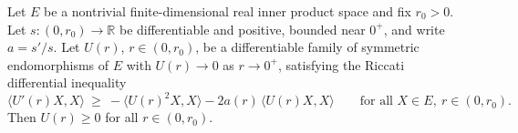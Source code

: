 \begin{lemma}
\label{lem:operator-riccati-lower}
\leanok
Let $E$ be a nontrivial finite-dimensional real inner product space
and fix $r_0>0$. Let $s\colon(0,r_0)\to\mathbb R$ be differentiable
and positive, bounded near $0^+$, and write $a=s'/s$. Let $U(r)$,
$r\in(0,r_0)$, be a differentiable family of symmetric
endomorphisms of $E$ with $U(r)\to0$ as $r\to0^+$, satisfying the
Riccati differential inequality
$$\langle U'(r)X,X\rangle\ \ge\
-\langle U(r)^2X,X\rangle-2a(r)\,\langle U(r)X,X\rangle
\qquad\text{for all }X\in E,\ r\in(0,r_0).$$
Then $U(r)\ge0$ for all $r\in(0,r_0)$.
\end{lemma}

